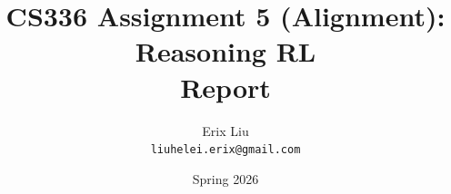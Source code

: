 \documentclass[11pt,a4paper]{article}
\title{CS336 Assignment 5 (Alignment): Reasoning RL\\[0.3em]\large Report}
\author{Erix Liu \\ \texttt{liuhelei.erix@gmail.com}}
\date{Spring 2026}
\begin{document}
\maketitle
\thispagestyle{empty}
\tableofcontents
\newpage


\FloatBarrier

\FloatBarrier

\FloatBarrier

\FloatBarrier

\FloatBarrier


\clearpage
\begin{appendices}


\end{appendices}
\end{document}

